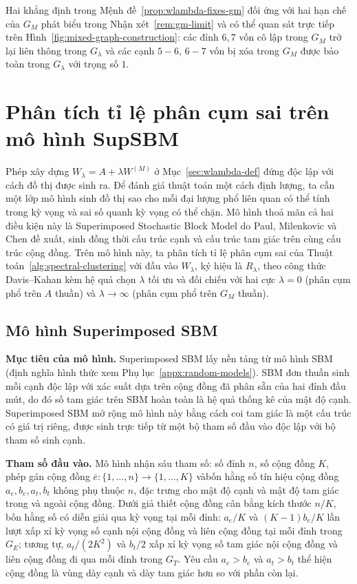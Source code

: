 Hai khẳng định trong Mệnh đề~\ref{prop:wlambda-fixes-gm} đối ứng với hai hạn chế của $G_M$ phát biểu trong Nhận xét~\ref{rem:gm-limit} và có thể quan sát trực tiếp trên Hình~\ref{fig:mixed-graph-construction}: các đỉnh $6, 7$ vốn cô lập trong $G_M$ trở lại liên thông trong $G_\lambda$ và các cạnh $5{-}6$, $6{-}7$ vốn bị xóa trong $G_M$ được bảo toàn trong $G_\lambda$ với trọng số $1$.

\section{Phân tích tỉ lệ phân cụm sai trên mô hình SupSBM}
\label{sec:wlambda-supsbm}

Phép xây dựng $W_\lambda = A + \lambda W^{(M)}$ ở Mục~\ref{sec:wlambda-def} đứng độc lập với cách đồ thị được sinh ra. Để đánh giá thuật toán một cách định lượng, ta cần một lớp mô hình sinh đồ thị sao cho mỗi đại lượng phổ liên quan có thể tính trong kỳ vọng và sai số quanh kỳ vọng có thể chặn. Mô hình thoả mãn cả hai điều kiện này là Superimposed Stochastic Block Model do Paul, Milenkovic và Chen \cite{paul2023hosc} đề xuất, sinh đồng thời cấu trúc cạnh và cấu trúc tam giác trên cùng cấu trúc cộng đồng. Trên mô hình này, ta phân tích tỉ lệ phân cụm sai của Thuật toán~\ref{alg:spectral-clustering} với đầu vào $W_\lambda$, ký hiệu là $R_\lambda$, theo công thức Davis--Kahan kèm hệ quả chọn $\lambda$ tối ưu và đối chiếu với hai cực $\lambda = 0$ (phân cụm phổ trên $A$ thuần) và $\lambda \to \infty$ (phân cụm phổ trên $G_M$ thuần).

\subsection{Mô hình Superimposed SBM}
\label{subsec:supsbm}

\textbf{Mục tiêu của mô hình.} Superimposed SBM \cite{paul2023hosc} lấy nền tảng từ mô hình SBM (định nghĩa hình thức xem Phụ lục~\ref{appx:random-models}). SBM đơn thuần sinh mỗi cạnh độc lập với xác suất dựa trên cộng đồng đã phân sẵn của hai đỉnh đầu mút, do đó số tam giác trên SBM hoàn toàn là hệ quả thống kê của mật độ cạnh. Superimposed SBM mở rộng mô hình này bằng cách coi tam giác là một cấu trúc có giá trị riêng, được sinh trực tiếp từ một bộ tham số đầu vào độc lập với bộ tham số sinh cạnh.

\textbf{Tham số đầu vào.} Mô hình nhận sáu tham số: số đỉnh $n$, số cộng đồng $K$, phép gán cộng đồng $\bar e: \{1, \ldots, n\} \to \{1, \ldots, K\}$ vàbốn hằng số tín hiệu cộng đồng $a_e, b_e, a_t, b_t$ không phụ thuộc $n$, đặc trưng cho mật độ cạnh và mật độ tam giác trong và ngoài cộng đồng. Dưới giả thiết cộng đồng cân bằng kích thước $n/K$, bốn hằng số có diễn giải qua kỳ vọng tại mỗi đỉnh: $a_e/K$ và $(K-1) b_e/K$ lần lượt xấp xỉ kỳ vọng số cạnh nội cộng đồng và liên cộng đồng tại mỗi đỉnh trong $G_E$; tương tự, $a_t/(2K^2)$ và $b_t/2$ xấp xỉ kỳ vọng số tam giác nội cộng đồng và liên cộng đồng đi qua mỗi đỉnh trong $G_T$. Yêu cầu $a_e > b_e$ và $a_t > b_t$ thể hiện cộng đồng là vùng dày cạnh và dày tam giác hơn so với phần còn lại.

